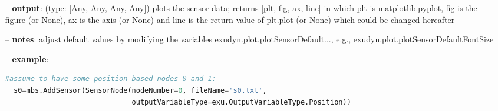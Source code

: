 \begin{itemize}[leftmargin=0.7cm]
\begin{itemize}[leftmargin=1.2cm]
\item[]{\it sizeInches}: given as list [sizeX, sizeY] with the sizes per (sub)plot given in inches; default: [6.4, 4.8]; in case of sub plots, the total size of the figure is computed from nx*sizeInches[0] and ny*sizeInches[1]
\item[]{\it fileName}: if this string is non-empty, figure will be saved to given path and filename (use figName.pdf to safe as PDF or figName.png to save as PNG image); use matplotlib.use('Agg') in order not to open figures if you just want to save them
\item[]{\it useXYZcomponents}: of True, it will use X, Y and Z for sensor components, e.g., measuring Position, Velocity, etc. wherever possible
\item[]{\it closeAll}: if True, close all figures before opening new one (do this only in first PlotSensor command!)
\item[]{\it [*kwargs]}:
\item[]{\it minorTicksXon}: if True, turn minor ticks for x-axis on
\item[]{\it minorTicksYon}: if True, turn minor ticks for y-axis on
\item[]{\it logScaleX}: use log scale for x-axis
\item[]{\it logScaleY}: use log scale for y-axis
\item[]{\it fileCommentChar}: if exists, defines the comment character in files (#, \%, ...)
\item[]{\it fileDelimiterChar}: if exists, defines the character indicating the columns for data (',', ' ', ';', ...)
\end{itemize}
\item[--]
{\bf output}: (type: [Any, Any, Any, Any]) plots the sensor data; returns [plt, fig, ax, line] in which plt is matplotlib.pyplot, fig is the figure (or None), ax is the axis (or None) and line is the return value of plt.plot (or None) which could be changed hereafter
\item[--]
{\bf notes}: adjust default values by modifying the variables exudyn.plot.plotSensorDefault..., e.g., exudyn.plot.plotSensorDefaultFontSize
\item[--]
{\bf example}: \vspace{-12pt}\ei\begin{lstlisting}[language=Python, xleftmargin=36pt]
  #assume to have some position-based nodes 0 and 1:
  s0=mbs.AddSensor(SensorNode(nodeNumber=0, fileName='s0.txt',
                              outputVariableType=exu.OutputVariableType.Position))

\end{lstlisting}
\end{itemize}
